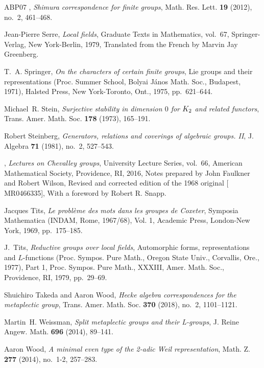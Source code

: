 \documentclass[10pt, letterpaper]{amsart}
\theoremstyle{plain}
\theoremstyle{definition}
\numberwithin{equation}{section}
\begin{document}
\begin{thebibliography}{ABP{\etalchar{+}}07}
\bysame, \emph{Shimura correspondence for finite groups}, Math. Res. Lett.
  \textbf{19} (2012), no.~2, 461--468.

Jean-Pierre Serre, \emph{Local fields}, Graduate Texts in Mathematics, vol.~67,
  Springer-Verlag, New York-Berlin, 1979, Translated from the French by Marvin
  Jay Greenberg.

T.~A. Springer, \emph{On the characters of certain finite groups}, Lie groups
  and their representations ({P}roc. {S}ummer {S}chool, {B}olyai {J}\'anos
  {M}ath. {S}oc., {B}udapest, 1971), Halsted Press, New York-Toronto, Ont.,
  1975, pp.~621--644.

Michael~R. Stein, \emph{Surjective stability in dimension {$0$} for {$K\sb{2}$}
  and related functors}, Trans. Amer. Math. Soc. \textbf{178} (1973), 165--191.

Robert Steinberg, \emph{Generators, relations and coverings of algebraic
  groups. {II}}, J. Algebra \textbf{71} (1981), no.~2, 527--543.

\bysame, \emph{Lectures on {C}hevalley groups}, University Lecture Series,
  vol.~66, American Mathematical Society, Providence, RI, 2016, Notes prepared
  by John Faulkner and Robert Wilson, Revised and corrected edition of the 1968
  original [ MR0466335], With a foreword by Robert R. Snapp.

Jacques Tits, \emph{Le probl\`eme des mots dans les groupes de {C}oxeter},
  Symposia {M}athematica ({INDAM}, {R}ome, 1967/68), {V}ol. 1, Academic Press,
  London-New York, 1969, pp.~175--185.

J.~Tits, \emph{Reductive groups over local fields}, Automorphic forms,
  representations and {$L$}-functions ({P}roc. {S}ympos. {P}ure {M}ath.,
  {O}regon {S}tate {U}niv., {C}orvallis, {O}re., 1977), {P}art 1, Proc. Sympos.
  Pure Math., XXXIII, Amer. Math. Soc., Providence, RI, 1979, pp.~29--69.

Shuichiro Takeda and Aaron Wood, \emph{Hecke algebra correspondences for the
  metaplectic group}, Trans. Amer. Math. Soc. \textbf{370} (2018), no.~2,
  1101--1121.

Martin~H. Weissman, \emph{Split metaplectic groups and their {L}-groups}, J.
  Reine Angew. Math. \textbf{696} (2014), 89--141.

Aaron Wood, \emph{A minimal even type of the 2-adic {W}eil representation},
  Math. Z. \textbf{277} (2014), no.~1-2, 257--283.

\end{thebibliography}
\end{document}
